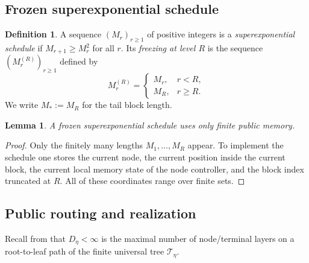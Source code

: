 \documentclass[12pt]{article}
\newtheorem{lemma}[theorem]{Lemma}
\theoremstyle{definition}
\newtheorem{definition}[theorem]{Definition}
\newcommand{\1}{\mathbf{1}}
\newcommand{\cT}{\mathcal{T}}
\begin{document}
\subsection{Frozen superexponential schedule}


\begin{definition}
A sequence $(M_r)_{r\ge 1}$ of positive integers is a
\emph{superexponential schedule} if $M_{r+1}\ge M_r^2$ for all $r$. Its
\emph{freezing at level $R$} is the sequence $(M_r^{(R)})_{r\ge 1}$ defined by
\[
M_r^{(R)}=
\begin{cases}
M_r, & r<R,\\
M_R, & r\ge R.
\end{cases}
\]
We write $M_*:=M_R$ for the tail block length.
\end{definition}

\begin{lemma}
\label{lem:frozen-memory}
A frozen superexponential schedule uses only finite public memory.
\end{lemma}

\begin{proof}
Only the finitely many lengths $M_1,\dots,M_R$ appear. To implement the schedule
one stores the current node, the current position inside the current block, the
current local memory state of the node controller, and the block index truncated at
$R$. All of these coordinates range over finite sets.
\end{proof}


\subsection{Public routing and realization}

Recall from  that $D_\eta<\infty$ is the maximal number of
node/terminal layers on a root-to-leaf path of the finite universal tree
$\cT_\eta$.
\end{document}
